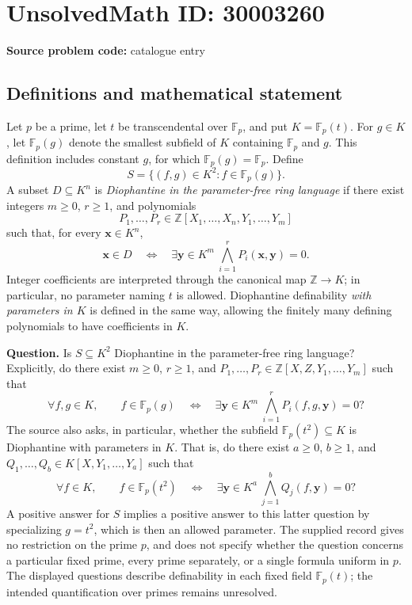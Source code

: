 \documentclass[11pt]{article}
\newcommand{\Z}{\mathbb{Z}}
\newcommand{\F}{\mathbb{F}}
\begin{document}
\section*{UnsolvedMath ID: 30003260}
\textbf{Source problem code:} catalogue entry
\subsection{Definitions and mathematical statement}
Let \(p\) be a prime, let \(t\) be transcendental over \(\F_p\), and put \(K=\F_p(t)\). For \(g\in K\), let \(\F_p(g)\) denote the smallest subfield of \(K\) containing \(\F_p\) and \(g\). This definition includes constant \(g\), for which \(\F_p(g)=\F_p\). Define
\[
S=\{(f,g)\in K^2:f\in\F_p(g)\}.
\]
A subset \(D\subseteq K^n\) is \emph{Diophantine in the parameter-free ring language} if there exist integers \(m\geq0\), \(r\geq1\), and polynomials
\[
P_1,\ldots,P_r\in\Z[X_1,\ldots,X_n,Y_1,\ldots,Y_m]
\]
such that, for every \(\mathbf x\in K^n\),
\[
\mathbf x\in D\quad\Longleftrightarrow\quad
\exists\mathbf y\in K^m\ \bigwedge_{i=1}^{r}P_i(\mathbf x,\mathbf y)=0.
\]
Integer coefficients are interpreted through the canonical map \(\Z\to K\); in particular, no parameter naming \(t\) is allowed. Diophantine definability \emph{with parameters in \(K\)} is defined in the same way, allowing the finitely many defining polynomials to have coefficients in \(K\).

\textbf{Question.} Is \(S\subseteq K^2\) Diophantine in the parameter-free ring language? Explicitly, do there exist \(m\geq0\), \(r\geq1\), and \(P_1,\ldots,P_r\in\Z[X,Z,Y_1,\ldots,Y_m]\) such that
\[
\forall f,g\in K,\qquad
f\in\F_p(g)\quad\Longleftrightarrow\quad
\exists\mathbf y\in K^m\ \bigwedge_{i=1}^{r}P_i(f,g,\mathbf y)=0?
\]
The source also asks, in particular, whether the subfield \(\F_p(t^2)\subseteq K\) is Diophantine with parameters in \(K\). That is, do there exist \(a\geq0\), \(b\geq1\), and \(Q_1,\ldots,Q_b\in K[X,Y_1,\ldots,Y_a]\) such that
\[
\forall f\in K,\qquad
f\in\F_p(t^2)\quad\Longleftrightarrow\quad
\exists\mathbf y\in K^a\ \bigwedge_{j=1}^{b}Q_j(f,\mathbf y)=0?
\]
A positive answer for \(S\) implies a positive answer to this latter question by specializing \(g=t^2\), which is then an allowed parameter. The supplied record gives no restriction on the prime \(p\), and does not specify whether the question concerns a particular fixed prime, every prime separately, or a single formula uniform in \(p\). The displayed questions describe definability in each fixed field \(\F_p(t)\); the intended quantification over primes remains unresolved.
\end{document}
